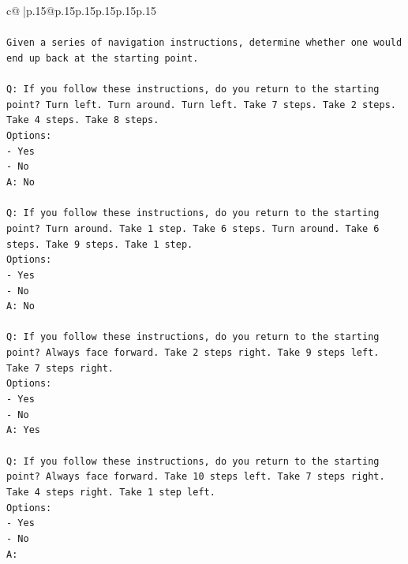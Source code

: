 \documentclass{article}
\begin{document}
{\begin{supertabular}{c@{$\;$}|p{.15\linewidth}@{}p{.15\linewidth}p{.15\linewidth}p{.15\linewidth}p{.15\linewidth}p{.15\linewidth}}
{{{\\ 
\\ 
\texttt{Given a series of navigation instructions, determine whether one would end up back at the starting point.} \\
\\ 
\texttt{Q: If you follow these instructions, do you return to the starting point? Turn left. Turn around. Turn left. Take 7 steps. Take 2 steps. Take 4 steps. Take 8 steps.} \\
\texttt{Options:} \\
\texttt{{-} Yes} \\
\texttt{{-} No} \\
\texttt{A: No} \\
\\ 
\texttt{Q: If you follow these instructions, do you return to the starting point? Turn around. Take 1 step. Take 6 steps. Turn around. Take 6 steps. Take 9 steps. Take 1 step.} \\
\texttt{Options:} \\
\texttt{{-} Yes} \\
\texttt{{-} No} \\
\texttt{A: No} \\
\\ 
\texttt{Q: If you follow these instructions, do you return to the starting point? Always face forward. Take 2 steps right. Take 9 steps left. Take 7 steps right.} \\
\texttt{Options:} \\
\texttt{{-} Yes} \\
\texttt{{-} No} \\
\texttt{A: Yes} \\
\\ 
\texttt{Q: If you follow these instructions, do you return to the starting point? Always face forward. Take 10 steps left. Take 7 steps right. Take 4 steps right. Take 1 step left.} \\
\texttt{Options:} \\
\texttt{{-} Yes} \\
\texttt{{-} No} \\
\texttt{A:} \\
            }
        }
    }
     \\ \\


\end{supertabular}}
\end{document}
